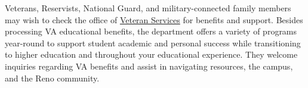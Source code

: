 Veterans, Reservists, National Guard, and military-connected family members may
wish to check the office of \href{https://www.unr.edu/veteran}{Veteran Services}
for benefits and support. Besides processing VA educational benefits, the
department offers a variety of programs year-round to support student academic and
personal success while transitioning to higher education and throughout your
educational experience. They welcome inquiries regarding VA benefits and assist in
navigating resources, the campus, and the Reno community.
